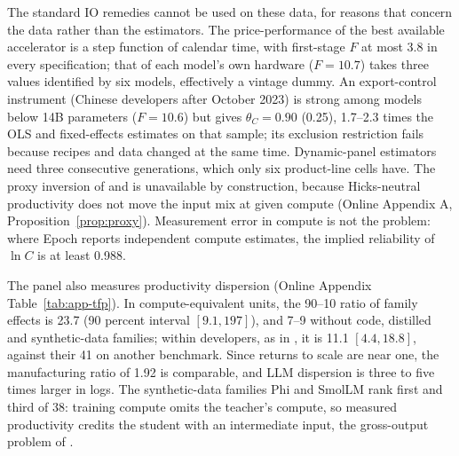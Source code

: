 The standard IO remedies cannot be used on these data, for reasons that concern the data rather than the estimators.
The price-performance of the best available accelerator is a step function of calendar time, with first-stage $F$ at
most 3.8 in every specification; that of each model's own hardware ($F=10.7$) takes three values identified by six
models, effectively a vintage dummy. An export-control instrument (Chinese developers after October 2023) is strong among models below 14B
parameters ($F=10.6$) but gives $\theta_C=0.90$ (0.25), 1.7--2.3 times the OLS and fixed-effects estimates on that sample;
its exclusion restriction fails because recipes and data changed at the same time. Dynamic-panel estimators \citep{arellano1991some,blundell1998initial} need three consecutive
generations, which only six product-line cells have. The proxy inversion of \citet{olley1996dynamics} and
\citet{levinsohn2003estimating} is unavailable by construction, because Hicks-neutral productivity does not move the
input mix at given compute (Online Appendix A, Proposition~\ref{prop:proxy}). Measurement error in compute is not the
problem: where Epoch reports independent compute estimates, the implied reliability of $\ln C$ is at least 0.988.

The panel also measures productivity dispersion (Online Appendix Table~\ref{tab:app-tfp}). In compute-equivalent units, the 90--10 ratio of family effects is
23.7 (90 percent interval $[9.1,197]$), and 7--9 without code, distilled and synthetic-data families; within developers,
as in \citet{mertens2026secret}, it is 11.1 $[4.4,18.8]$, against their 41 on another benchmark. Since returns to scale
are near one, the manufacturing ratio of 1.92 \citep{syverson2011determines} is comparable, and LLM dispersion is three
to five times larger in logs. The synthetic-data families Phi and SmolLM rank first and third of 38: training compute
omits the teacher's compute, so measured productivity credits the student with an intermediate input, the gross-output
problem of \citet{gandhi2020identification}.

